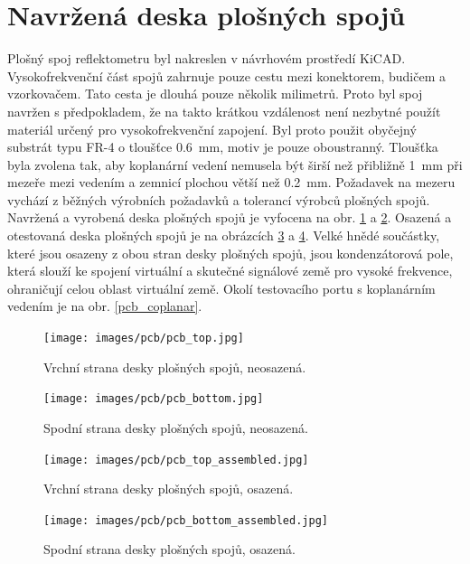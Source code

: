 \section{Navržená deska plošných spojů}
Plošný spoj reflektometru byl nakreslen v návrhovém prostředí KiCAD. Vysokofrekvenční část spojů zahrnuje pouze cestu mezi konektorem, budičem a vzorkovačem. Tato cesta je dlouhá pouze několik milimetrů. Proto byl spoj navržen s předpokladem, že na takto krátkou vzdálenost není nezbytné použít materiál určený pro vysokofrekvenční zapojení. Byl proto použit obyčejný substrát typu FR-4 o tloušťce \SI{0.6}{\milli\meter}, motiv je pouze oboustranný. Tloušťka byla zvolena tak, aby koplanární vedení nemusela být širší než přibližně \SI{1}{\milli\meter} při mezeře mezi vedením a zemnicí plochou větší než \SI{0.2}{\milli\meter}. Požadavek na mezeru vychází z běžných výrobních požadavků a tolerancí výrobců plošných spojů. Navržená a vyrobená deska plošných spojů je vyfocena na obr. \ref{pcb_top_unassembled} a \ref{pcb_bottom_unassembled}. Osazená a otestovaná deska plošných spojů je na obrázcích \ref{pcb_top_assembled} a \ref{pcb_bottom_assembled}. Velké hnědé součástky, které jsou osazeny z obou stran desky plošných spojů, jsou kondenzátorová pole, která slouží ke spojení virtuální a skutečné signálové země pro vysoké frekvence, ohraničují celou oblast virtuální země. Okolí testovacího portu s koplanárním vedením je na obr. \ref{pcb_coplanar}.

\begin{figure}[htbp]
\texttt{[image: images/pcb/pcb\_top.jpg]}\caption{Vrchní strana desky plošných spojů, neosazená.}\label{pcb_top_unassembled}
\end{figure}

\begin{figure}[htbp]
\texttt{[image: images/pcb/pcb\_bottom.jpg]}\caption{Spodní strana desky plošných spojů, neosazená.}\label{pcb_bottom_unassembled}
\end{figure}

\begin{figure}[htbp]
\texttt{[image: images/pcb/pcb\_top\_assembled.jpg]}\caption{Vrchní strana desky plošných spojů, osazená.}\label{pcb_top_assembled}
\end{figure}

\begin{figure}[htbp]
\texttt{[image: images/pcb/pcb\_bottom\_assembled.jpg]}\caption{Spodní strana desky plošných spojů, osazená.}\label{pcb_bottom_assembled}
\end{figure}

